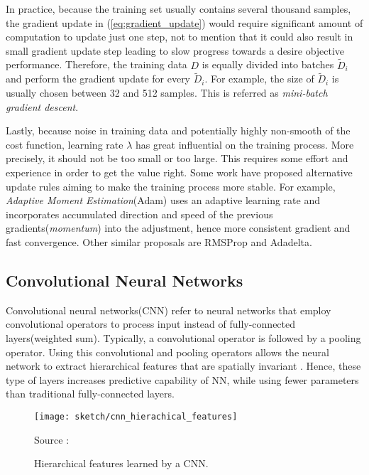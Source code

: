 In practice, because the training set usually contains several thousand samples, the gradient update in  (\ref{eq:gradient_update}) would require significant amount of computation to update just one step, not to mention that it could also result in small gradient update step leading to slow progress towards a desire objective performance. Therefore, the training data $D$ is equally divided into batches  $\widetilde{D}_i$  and perform the gradient update for every $\widetilde{D}_i$. For example, the size of $\widetilde{D}_i$ is usually chosen between 32 and 512 samples. This is referred  as \textit{mini-batch gradient descent}.

Lastly, because noise in training data and potentially highly non-smooth of the cost function, learning rate $\lambda$ has great influential on the training process. More precisely, it should not be too small or too large. This requires some effort and experience in order to get the value right. Some work have proposed alternative update rules aiming to make the training process more stable. For example,  \textit{Adaptive Moment Estimation}(Adam)\cite{KingmaAdamMethodStochastic2014}  uses an adaptive learning rate  and incorporates accumulated direction and speed of the previous gradients(\textit{momentum}) into the adjustment, hence more consistent gradient and fast convergence. Other similar proposals are RMSProp\cite{TielemanLectureRmsPropDivide2012} and Adadelta\cite{ZeilerADADELTAAdaptiveLearning2012}.


\subsection{Convolutional Neural Networks} \label{sec:conv}
Convolutional neural networks(CNN) refer to neural networks that employ convolutional operators to process input instead of fully-connected layers(weighted sum). Typically, a convolutional operator is followed by a pooling operator. Using this convolutional and pooling operators allows the neural network to extract hierarchical features that are spatially invariant \cite{ZeilerVisualizingUnderstandingConvolutional2013}. Hence, these type of layers increases predictive capability of NN, while using fewer parameters than traditional fully-connected layers.

\begin{figure}[!hbt]
    \begin{center}
		\texttt{[image: sketch/cnn\_hierachical\_features]}
		\caption{Hierarchical features learned by a CNN.}
		\label{fig:conv_intuition}
		\small{Source : \cite{LeeConvolutionalDeepBelief2009}}
	\end{center}
\end{figure}


